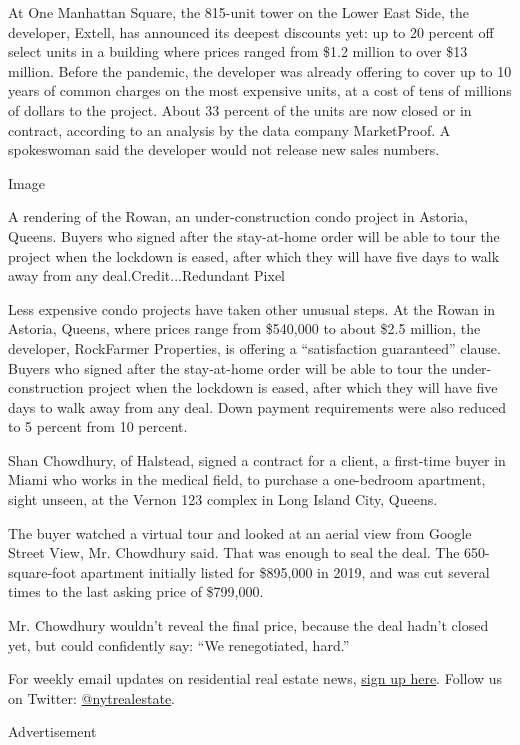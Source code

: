 At One Manhattan Square, the 815-unit tower on the Lower East Side, the
developer, Extell, has announced its deepest discounts yet: up to 20
percent off select units in a building where prices ranged from \$1.2
million to over \$13 million. Before the pandemic, the developer was
already offering to cover up to 10 years of common charges on the most
expensive units, at a cost of tens of millions of dollars to the
project. About 33 percent of the units are now closed or in contract,
according to an analysis by the data company MarketProof. A spokeswoman
said the developer would not release new sales numbers.

Image

A rendering of the Rowan, an under-construction condo project in
Astoria, Queens. Buyers who signed after the stay-at-home order will be
able to tour the project when the lockdown is eased, after which they
will have five days to walk away from any deal.Credit...Redundant Pixel

Less expensive condo projects have taken other unusual steps. At the
Rowan in Astoria, Queens, where prices range from \$540,000 to about
\$2.5 million, the developer, RockFarmer Properties, is offering a
``satisfaction guaranteed'' clause. Buyers who signed after the
stay-at-home order will be able to tour the under-construction project
when the lockdown is eased, after which they will have five days to walk
away from any deal. Down payment requirements were also reduced to 5
percent from 10 percent.

Shan Chowdhury, of Halstead, signed a contract for a client, a
first-time buyer in Miami who works in the medical field, to purchase a
one-bedroom apartment, sight unseen, at the Vernon 123 complex in Long
Island City, Queens.

The buyer watched a virtual tour and looked at an aerial view from
Google Street View, Mr. Chowdhury said. That was enough to seal the
deal. The 650-square-foot apartment initially listed for \$895,000 in
2019, and was cut several times to the last asking price of \$799,000.

Mr. Chowdhury wouldn't reveal the final price, because the deal hadn't
closed yet, but could confidently say: ``We renegotiated, hard.''

For weekly email updates on residential real estate news,
\href{http://www.nytimes3xbfgragh.onion/newsletters/realestate/}{sign up
here}. Follow us on Twitter:
\href{https://twitter.com/nytrealestate}{@nytrealestate}.

Advertisement

